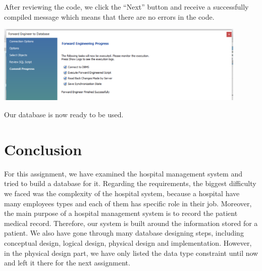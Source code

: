 \documentclass[a4paper]{article}
\numberwithin{equation}{section}
\begin{document}
After reviewing the code, we click the ``Next'' button and receive a successfully compiled message which means that there are no errors in the code.

\begin{center}
  \includegraphics[width=0.9\textwidth]{./assets/step2.png}
\end{center}

Our database is now ready to be used.

\newpage

\section{Conclusion}
For this assignment, we have examined the hospital management system and tried to build a database for it. Regarding the requirements, the biggest difficulty we faced was the complexity of the hospital system, because a hospital have many employees types and each of them has specific role in their job. Moreover, the main purpose of a hospital management system is to record the patient medical record. Therefore, our system is built around the information stored for a patient. We also have gone through many database designing steps, including conceptual design, logical design, physical design and implementation. However, in the physical design part, we have only listed the data type constraint until now and left it there for the next assignment.
\end{document}
